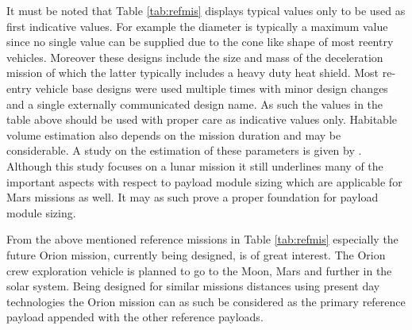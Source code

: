 It must be noted that Table \ref{tab:refmis} displays typical values only to be used as first indicative values. For example the diameter is typically a maximum value since no single value can be supplied due to the cone like shape of most reentry vehicles. Moreover these designs include the size and mass of the deceleration mission of which the latter typically includes a heavy duty heat shield. Most re-entry vehicle base designs were used multiple times with minor design changes and a single externally communicated design name. As such the values in the table above should be used with proper care as indicative values only. Habitable volume estimation also depends on the mission duration and may be considerable. A study on the estimation of these parameters is given by \cite{Rudisill2008}. Although this study focuses on a lunar mission it still underlines many of the important aspects with respect to payload module sizing which are applicable for Mars missions as well. It may as such prove a proper foundation for payload module sizing. 

From the above mentioned reference missions in Table \ref{tab:refmis} especially the future Orion mission, currently being designed, is of great interest. The Orion crew exploration vehicle is planned to go to the Moon, Mars and further in the solar system. Being designed for similar missions distances using present day technologies the Orion mission can as such be considered as the primary reference payload appended with the other reference payloads.



